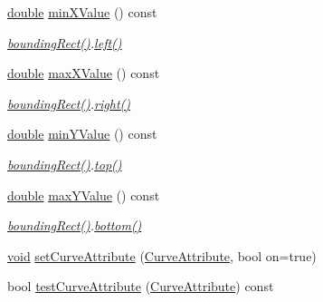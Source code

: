 \begin{DoxyCompactItemize}
\item 
\hyperlink{_super_l_u_support_8h_a8956b2b9f49bf918deed98379d159ca7}{double} \hyperlink{class_qwt_plot_curve_a20c92bfce270e71893cdfa465781017b}{min\-X\-Value} () const 
\begin{DoxyCompactList}\small\item\em \hyperlink{class_qwt_plot_series_item_a183e7c88364eeea8e7c53b56604e0763}{bounding\-Rect()}.\hyperlink{glext_8h_a85b8f6c07fbc1fb5d77c2ae090f21995}{left()} \end{DoxyCompactList}\item 
\hyperlink{_super_l_u_support_8h_a8956b2b9f49bf918deed98379d159ca7}{double} \hyperlink{class_qwt_plot_curve_a2428e72e84b23a9442ae48fe4540c17f}{max\-X\-Value} () const 
\begin{DoxyCompactList}\small\item\em \hyperlink{class_qwt_plot_series_item_a183e7c88364eeea8e7c53b56604e0763}{bounding\-Rect()}.\hyperlink{glext_8h_a5ffadbbacc6b89cf6218bc43b384d3fe}{right()} \end{DoxyCompactList}\item 
\hyperlink{_super_l_u_support_8h_a8956b2b9f49bf918deed98379d159ca7}{double} \hyperlink{class_qwt_plot_curve_a09f7aac646f0e534c2540d61a027b856}{min\-Y\-Value} () const 
\begin{DoxyCompactList}\small\item\em \hyperlink{class_qwt_plot_series_item_a183e7c88364eeea8e7c53b56604e0763}{bounding\-Rect()}.\hyperlink{glext_8h_a5ab323daeacf8dfdb8f91132fecdca23}{top()} \end{DoxyCompactList}\item 
\hyperlink{_super_l_u_support_8h_a8956b2b9f49bf918deed98379d159ca7}{double} \hyperlink{class_qwt_plot_curve_a135a412978bf646716b37b0ac8528665}{max\-Y\-Value} () const 
\begin{DoxyCompactList}\small\item\em \hyperlink{class_qwt_plot_series_item_a183e7c88364eeea8e7c53b56604e0763}{bounding\-Rect()}.\hyperlink{glext_8h_a95fc257e5ddf46f7db9d5e898cdf1991}{bottom()} \end{DoxyCompactList}\item 
\hyperlink{group___u_a_v_objects_plugin_ga444cf2ff3f0ecbe028adce838d373f5c}{void} \hyperlink{class_qwt_plot_curve_a6ac9243e280f96cd149102a91271a473}{set\-Curve\-Attribute} (\hyperlink{class_qwt_plot_curve_a38064f7de6f026a49db782c365f872c3}{Curve\-Attribute}, bool on=true)
\item 
bool \hyperlink{class_qwt_plot_curve_a0dc5e6af9ec33a1b54e3c3041c00b939}{test\-Curve\-Attribute} (\hyperlink{class_qwt_plot_curve_a38064f7de6f026a49db782c365f872c3}{Curve\-Attribute}) const 

\end{DoxyCompactItemize}
